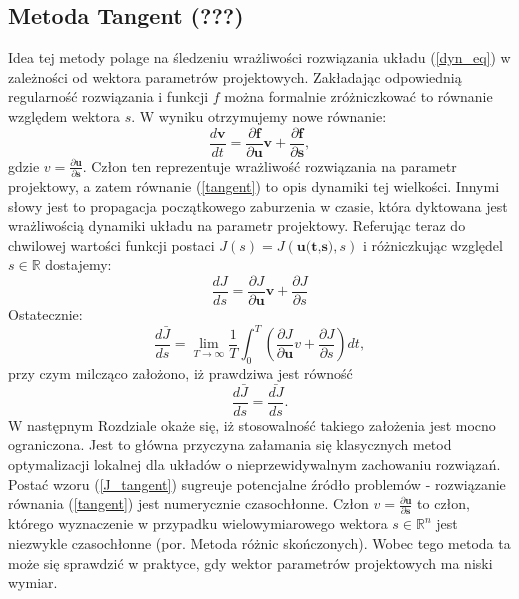 \documentclass[12pt]{article}
\begin{document}
\subsection{Metoda Tangent (???)}
Idea tej metody polage na śledzeniu wrażliwości rozwiązania układu (\ref{dyn_eq}) w zależności od wektora parametrów projektowych. Zakładając odpowiednią regularność rozwiązania i funkcji $ f $ można formalnie zróżniczkować to równanie względem wektora $ s $. W wyniku otrzymujemy nowe równanie:
\begin{equation}
\frac{d{\textbf{v}}}{d{t}} = \frac{\partial{\textbf{f}}}{\partial{\textbf{u}}}\textbf{v} + \frac{\partial{\textbf{f}}}{\partial{\textbf{s}}}
\label{tangent},
\end{equation}
gdzie $ v = \frac{\partial{\textbf{u}}}{\partial{\textbf{s}}} $. Człon ten reprezentuje wrażliwość rozwiązania na parametr projektowy, a zatem równanie (\ref{tangent}) to opis dynamiki tej wielkości. Innymi słowy jest to propagacja początkowego zaburzenia w czasie, która dyktowana jest wrażliwością dynamiki układu na parametr projektowy. Referując teraz do chwilowej wartości funkcji postaci $ J(s) = J(\textbf{u(t,s)},s) $ i różniczkując względel $ s \in \mathbb{R} $ dostajemy:
\begin{equation}
\frac{dJ}{ds} = \frac{\partial{J}}{\partial{\textbf{u}}}\textbf{v} + \frac{\partial{J}}{\partial{s}}
\end{equation} 
Ostatecznie:
\begin{equation}
\frac{d\bar{J}}{ds} = \lim\limits_{T \rightarrow \infty}\frac{1}{T}\int_{0}^{T}(\frac{\partial{J}}{\partial{\textbf{u}}}v + \frac{\partial{J}}{\partial{s}})dt,
\label{J_tangent}
\end{equation}
przy czym milcząco założono, iż prawdziwa jest równość 
\begin{equation}
\frac{d\bar{J}}{ds} = \bar{\frac{dJ}{ds}}.
\label{djbar_bardj}
\end{equation}
W następnym Rozdziale okaże się, iż stosowalność takiego założenia jest mocno ograniczona. Jest to główna przyczyna załamania się klasycznych metod optymalizacji lokalnej dla układów o nieprzewidywalnym zachowaniu rozwiązań. \newline
Postać wzoru (\ref{J_tangent}) sugreuje potencjalne źródło problemów - rozwiązanie równania (\ref{tangent}) jest numerycznie czasochłonne. Człon $ v = \frac{\partial{\textbf{u}}}{\partial{\textbf{s}}} $ to człon, którego wyznaczenie w przypadku wielowymiarowego wektora $ s \in \mathbb{R}^n $ jest niezwykle czasochłonne (por. Metoda różnic skończonych). Wobec tego metoda ta może się sprawdzić w praktyce, gdy wektor parametrów projektowych ma niski wymiar.
\end{document}
